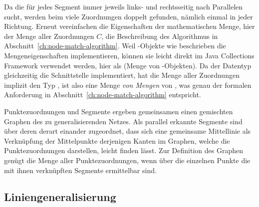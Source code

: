 \documentclass[../main/thesis.tex]{subfiles}
\begin{document}
Da die  für jedes Segment immer jeweils links- und rechtsseitig nach Parallelen sucht, werden beim  viele Zuordnungen doppelt gefunden, nämlich einmal in jeder Richtung.
Erneut vereinfachen die Eigenschaften der mathematischen Menge, hier der Menge aller Zuordnungen $C$, die Beschreibung des Algorithmus in Abschnitt~\ref{ch:node-match-algorithm}.
Weil -Objekte wie beschrieben die Mengeneigenschaften implementieren, können sie leicht direkt im Java Collections Framework verwendet werden, hier als  (Menge von -Objekten).
Da der Datentyp  gleichzeitig die Schnittstelle  implementiert, hat die Menge aller Zuordnungen implizit den Typ , ist also eine Menge \emph{von Mengen} von , was genau der formalen Anforderung in Abschnitt~\ref{ch:node-match-algorithm} entspricht.


Punktezuordnungen und Segmente ergeben gemeinsamen einen gemischten Graphen des zu generalisierenden Netzes.
Als parallel erkannte Segmente sind über deren  derart einander zugeordnet, dass sich eine gemeinsame Mittellinie als Verknüpfung der Mittelpunkte derjenigen Kanten im Graphen, welche die Punktezuordnungen darstellen, leicht finden lässt.
Zur Definition des Graphen genügt die Menge aller Punktezuordnungen, wenn über die einzelnen Punkte die mit ihnen verknüpften Segmente ermittelbar sind.




\subsection{Liniengeneralisierung}




\end{document}
